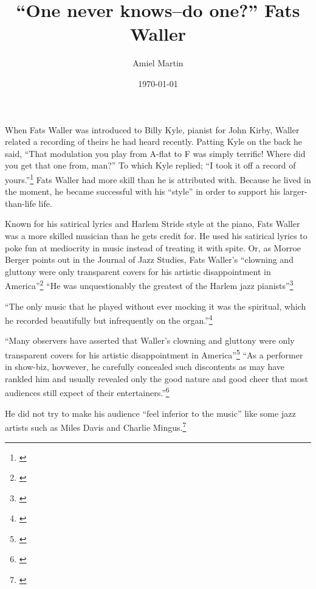 \documentclass[11pt]{report}
\title{``One never knows--do one?'' Fats Waller}
\author{Amiel Martin}
\date{\today}
\begin{document}
	\maketitle
	
	
	\label{sec:introduction}
	
		When Fats Waller was introduced to Billy Kyle, pianist for John Kirby, Waller related a recording of theirs he had heard recently. Patting Kyle on the back he said, ``That modulation you play from A-flat to F was simply terrific! Where did you get that one from, man?'' To which Kyle replied; ``I took it off a record of yours.''\footnote{\cite[231]{anecdotes}}
		Fats Waller had more skill than he is attributed with. Because he lived in the moment, he became successful with his ``style'' in order to support his larger-than-life life.
		
		Known for his satirical lyrics and Harlem Stride style at the piano, Fats Waller was a more skilled musician than he gets credit for. He used his satirical lyrics to poke fun at mediocrity in music instead of treating it with spite. Or, as Morroe Berger points out in the Journal of Jazz Studies, Fats Waller's ``clowning and gluttony were only transparent covers for his artistic disappointment in America''\footnote{\cite[4]{outside-insider}}
		``He was unquestionably the greatest of the Harlem jazz pianists''\footnote{\cite[2]{shipton}}
		
		``The only music that he played without ever mocking it was the spiritual, which he recorded beautifully but infrequently on the organ.''\footnote{\cite[8]{outside-insider}}
		
		``Many observers have asserted that Waller's clowning and gluttony were only transparent covers for his artistic disappointment in America''\footnote{\cite[4]{outside-insider}} ``As a performer in show-biz, hovwever, he carefully concealed such discontents as may have rankled him and usually revealed only the good nature and good cheer that most audiences still expect of their entertainers.''\footnote{\cite[4]{outside-insider}}
		
		He did not try to make his audience ``feel inferior to the music'' like some jazz artists such as Miles Davis and Charlie Mingus.\footnote{\cite[16]{outside-insider}}
		
		
		
		
	
	
	
\end{document}
